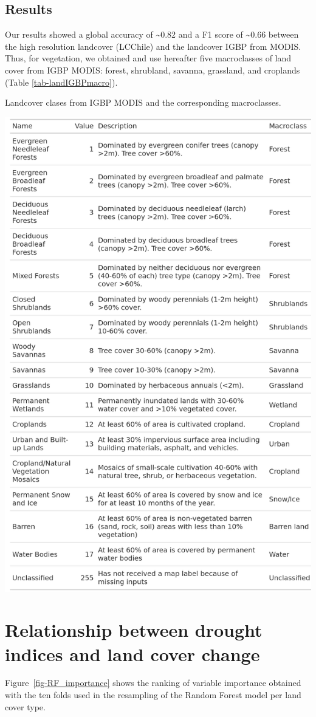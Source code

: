 \documentclass[
  authoryear,
  preprint,
  3p,
  onecolumn]{elsarticle}
\begin{document}
\hypertarget{results-1}{%
\subsection{Results}\label{results-1}}

Our results showed a global accuracy of \textasciitilde0.82 and a F1
score of \textasciitilde0.66 between the high resolution landcover
(LCChile) and the landcover IGBP from MODIS. Thus, for vegetation, we
obtained and use hereafter five macroclasses of land cover from IGBP
MODIS: forest, shrubland, savanna, grassland, and croplands (Table
\ref{tab-landIGBPmacro}).

\begin{table}[!ht]
\caption{Landcover clases from IGBP MODIS and the corresponding macroclasses.}
\label{tab-landIGBPmacro}
\centering
\includegraphics[width = .3\textwidth]{../output/figs/tabla_landcover_macroclass.png}
\end{table}

\hypertarget{relationship-between-drought-indices-and-land-cover-change}{%
\section{Relationship between drought indices and land cover
change}\label{relationship-between-drought-indices-and-land-cover-change}}

Figure~\ref{fig-RF_importance} shows the ranking of variable importance
obtained with the ten folds used in the resampling of the Random Forest
model per land cover type.
\end{document}
